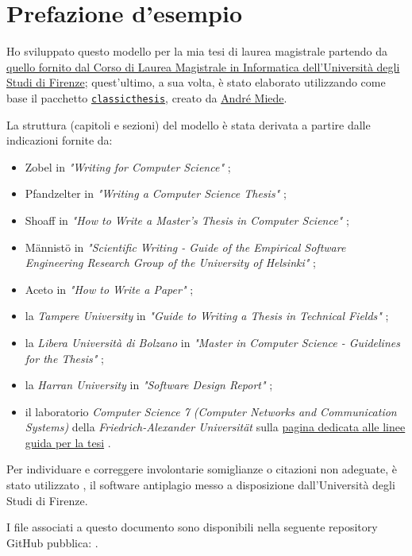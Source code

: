 \section*{Prefazione d'esempio}

Ho sviluppato questo modello per la mia tesi di laurea magistrale partendo da \href{https://www.informaticamagistrale.unifi.it/vp-17-per-laurearsi.html}{quello fornito dal Corso di Laurea Magistrale in Informatica dell'Università degli Studi di Firenze}; quest'ultimo, a sua volta, è stato elaborato utilizzando come base il pacchetto \href{https://www.ctan.org/pkg/classicthesis}{\texttt{classicthesis}}, creato da \href{https://www.miede.de/}{André Miede}.

\medskip

La struttura (capitoli e sezioni) del modello è stata derivata a partire dalle indicazioni fornite da:
\begin{itemize}

\item Zobel in \textit{"Writing for Computer Science"} \cite{zobel2015writing};

\item Pfandzelter \etAl in \textit{"Writing a Computer Science Thesis"} \cite{pfandzelter2022thesis};

\item Shoaff in \textit{"How to Write a Master's Thesis in Computer Science"} \cite{shoaff2001thesis};

\item Männistö \etAl in \textit{"Scientific Writing - Guide of the Empirical Software Engineering Research Group of the University of Helsinki"} \cite{mannisto2022guide};

\item Aceto in \textit{"How to Write a Paper"} \cite{aceto2023paper};

\item la \textit{Tampere University} in \textit{"Guide to Writing a Thesis in Technical Fields"} \cite{tuni2019guide};

\item la \textit{Libera Università di Bolzano} in \textit{"Master in Computer Science - Guidelines for the Thesis"} \cite{unibz2022thesis};

\item la \textit{Harran University} in \textit{"Software Design Report"} \cite{harran2023design};

\item il laboratorio \textit{Computer Science 7 (Computer Networks and Communication Systems)} della \textit{Friedrich-Alexander Universität} sulla \href{https://www.cs7.tf.fau.eu/teaching/student-theses/writing-your-thesis/}{pagina dedicata alle linee guida per la tesi} \cite{fau2023thesis}.

\end{itemize}

Per individuare e correggere involontarie somiglianze o citazioni non adeguate, è stato utilizzato \myAntiplagio, il software antiplagio messo a disposizione dall'Università degli Studi di Firenze.

\medskip

I file \latex associati a questo documento sono disponibili nella seguente repository GitHub pubblica: \myThesisRepo.